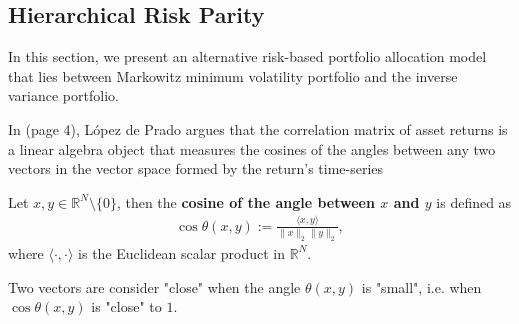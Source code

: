 %    
%    
    
\subsection{Hierarchical Risk Parity}\label{section:HierarchicalRiskParity}
    
    In this section, we present an alternative risk-based portfolio allocation model that lies between Markowitz minimum volatility portfolio and the inverse variance portfolio.
    
    In \cite{lopezmain} (page 4), López de Prado argues that the correlation matrix of asset returns is a linear algebra object that measures the cosines of the angles between any two vectors in the vector space formed by the return's time-series
    
    \begin{definition}
        Let $x, y \in \mathbb{R}^N \setminus \{ 0 \}$, then the \textbf{cosine of the angle between $x$ and $y$} is defined as
        \begin{align*}
            \cos \theta(x, y) := \frac{\langle x, y \rangle}{ \| x \|_2 \| y \|_2},
        \end{align*}
        where $\langle \cdot, \cdot \rangle$ is the Euclidean scalar product in $\mathbb{R}^N$.
        
        Two vectors are consider "close" when the angle $\theta(x, y)$ is "small", i.e. when $\cos \theta(x, y)$ is "close" to $1$.
    \end{definition}
    
